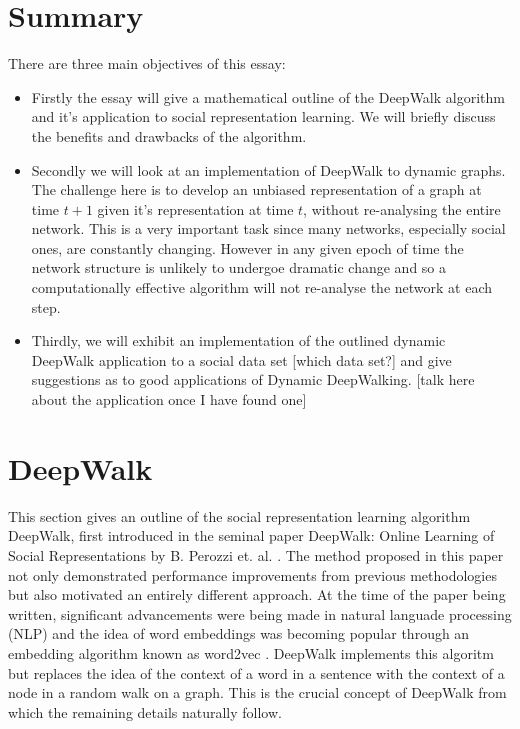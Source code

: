 \documentclass[a4paper]{article}
\begin{document}
\section{Summary}
There are three main objectives of this essay:
\begin{itemize}
  \item Firstly the essay will give a mathematical outline of the DeepWalk
    algorithm and it's application to social representation learning. We will
    briefly discuss the benefits and drawbacks of the algorithm.
  \item Secondly we will look at an implementation of DeepWalk to dynamic
    graphs. The challenge here is to develop an unbiased representation of a
    graph at time $t+1$ given it's representation at time $t$, without
    re-analysing the entire network. This is a very important task since many
    networks, especially social ones, are constantly changing. However in any given
    epoch of time the network structure is unlikely to undergoe dramatic change and
    so a computationally effective algorithm will not re-analyse the network at
    each step.
   \item Thirdly, we will exhibit an implementation of the outlined dynamic DeepWalk
     application to a social data set [which data set?] and give suggestions as
     to good applications of Dynamic DeepWalking. [talk here about the
     application once I have found one]
\end{itemize}

\section{DeepWalk}
This section gives an outline of the social representation learning algorithm
DeepWalk, first introduced in the seminal paper DeepWalk: Online Learning of Social
Representations by B. Perozzi et. al. \cite{deepwalk}. The method proposed in
this paper not only demonstrated performance improvements from previous methodologies but
also motivated an entirely different approach. At the time of the paper being
written, significant advancements were being made in natural languade processing (NLP)
and the idea of word embeddings was becoming popular through an embedding
algorithm known as word2vec \cite{mikolov2013efficient,mikolov2013distributed}.
DeepWalk implements this algoritm but replaces the idea of the context of a word in
a sentence with the context of a node in a random walk on a graph. This is the
crucial concept of DeepWalk from which the remaining details naturally follow.
\end{document}
